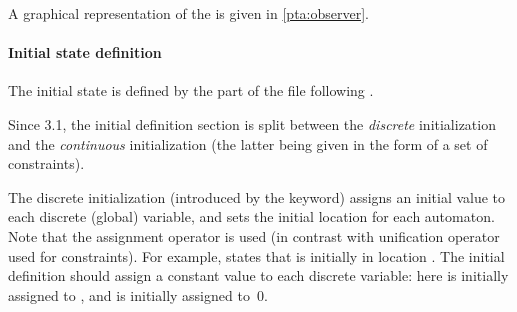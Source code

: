 A graphical representation of the \IPTA{}  is given in \cref{pta:observer}.


\paragraph{Initial state definition}

The initial state is defined by the part of the file following .

Since \imitator{} 3.1, the initial definition section is split between the \emph{discrete} initialization and the \emph{continuous} initialization (the latter being given in the form of a set of constraints).


The discrete initialization (introduced by the  keyword) assigns an initial value to each discrete (global) variable, and sets the initial location for each automaton.
Note that the assignment operator \styleIMI{:=} is used (in contrast with unification operator \styleIMI{=} used for constraints).
%
%
For example,  states that  is initially in location .
The initial definition should assign a constant value to each discrete variable:
here  is initially assigned to , and  is initially assigned to~0.

